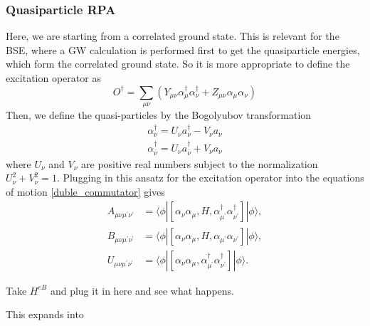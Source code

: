 \subsubsection{Quasiparticle RPA}
Here, we are starting from a correlated ground state. This is relevant for the BSE, where a GW calculation is performed first to get the quasiparticle energies, which form the correlated ground state. So it is more appropriate to define the excitation operator as
\begin{equation}
    O^{\dagger}=\sum_{\mu \nu}\left(Y_{\mu \nu} \alpha_\mu^{\dagger} \alpha_\nu^{\dagger}+Z_{\mu \nu} \alpha_\mu \alpha_\nu\right)
\end{equation}
Then, we define the quasi-particles by the Bogolyubov transformation
\begin{align}
    \alpha_\nu^{\dagger}=U_\nu a_\nu^{\dagger}-V_\nu a_\nu \\
    \alpha_{\bar{\nu}}^{\dagger}=U_\nu a_{\bar{\nu}}^{\dagger}+V_\nu a_\nu
\end{align}
where $U_\nu$ and $V_\nu$ are positive real numbers subject to the normalization $U_\nu^2+V_\nu^2=1$. Plugging in this ansatz for the excitation operator into the equations of motion \ref{duble_commutator} gives
\begin{align}
    A_{\mu \nu \mu^{\prime} \nu^{\prime}} &= \langle\phi|\left[\alpha_\nu \alpha_\mu, H, \alpha_{\mu^{\prime}}^{\dagger} \alpha_{\nu^{\prime}}^{\dagger}\right]|\phi\rangle, \\
    B_{\mu \nu \mu^{\prime} \nu^{\prime}} &= \langle\phi|\left[\alpha_\nu \alpha_\mu, H, \alpha_{\mu^{\prime}} \alpha_{\nu^{\prime}}\right]|\phi\rangle, \\
    U_{\mu \nu \mu^{\prime} \nu^{\prime}} &= \langle\phi|\left[\alpha_\nu \alpha_\mu, \alpha_{\mu^{\prime}}^{\dagger} \alpha_{\nu^{\prime}}^{\dagger}\right]|\phi\rangle .
\end{align}
\begin{tcolorbox}[colback=red!10!white, colframe=red!50!black, title=Idea]
Take $H^{eB}$ and plug it in here and see what happens.
\end{tcolorbox}
This expands into
